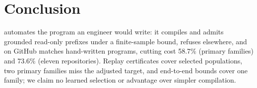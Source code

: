 \section{Conclusion}

\method automates the program an engineer would write: it compiles and admits grounded
read-only prefixes under a finite-sample bound, refuses elsewhere, and on GitHub
matches hand-written programs, cutting cost 58.7\% (primary families) and 73.6\%
(eleven repositories). Replay certificates cover selected populations,
two primary families miss the adjusted target, and end-to-end bounds cover one
family; we claim no learned selection or advantage over simpler compilation.
